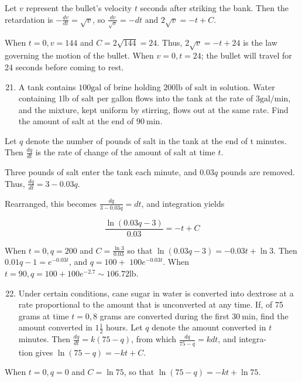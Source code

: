 \documentclass[10pt]{article}
\begin{document}
Let $v$ represent the bullet's velocity $t$ seconds after striking the bank. Then the retardation is $-\frac{d v}{d t}=\sqrt{v}$, so $\frac{d v}{\sqrt{v}}=-d t$ and $2 \sqrt{v}=-t+C$.

When $t=0, v=144$ and $C=2 \sqrt{144}=24$. Thus, $2 \sqrt{v}=-t+24$ is the law governing the motion of the bullet. When $v=0, t=24$; the bullet will travel for 24 seconds before coming to rest.

\begin{enumerate}
  \setcounter{enumi}{20}
  \item A tank contains $100 \mathrm{gal}$ of brine holding $200 \mathrm{lb}$ of salt in solution. Water containing $1 \mathrm{lb}$ of salt per gallon flows into the tank at the rate of $3 \mathrm{gal} / \mathrm{min}$, and the mixture, kept uniform by stirring, flows out at the same rate. Find the amount of salt at the end of $90 \mathrm{~min}$.
\end{enumerate}

Let $q$ denote the number of pounds of salt in the tank at the end of $\mathrm{t}$ minutes. Then $\frac{d q}{d t}$ is the rate of change of the amount of salt at time $t$.

Three pounds of salt enter the tank each minute, and $0.03 q$ pounds are removed. Thus, $\frac{d q}{d t}=3-0.03 q$.

Rearranged, this becomes $\frac{d q}{3-0.03 q}=d t$, and integration yields

$$
\frac{\ln (0.03 q-3)}{0.03}=-t+C
$$

When $t=0, q=200$ and $C=\frac{\ln 3}{0.03}$ so that $\ln (0.03 q-3)=-0.03 t+\ln 3$. Then $0.01 q-1=e^{-0.03 t}$, and $q=100+$ $100 e^{-0.03 t}$. When $t=90, q=100+100 e^{-2.7} \sim 106.72 \mathrm{lb}$.

\begin{enumerate}
  \setcounter{enumi}{21}
  \item Under certain conditions, cane sugar in water is converted into dextrose at a rate proportional to the amount that is unconverted at any time. If, of 75 grams at time $t=0,8$ grams are converted during the first $30 \mathrm{~min}$, find the amount converted in $1 \frac{1}{2}$ hours. Let $q$ denote the amount converted in $t$ minutes. Then $\frac{d q}{d t}=k(75-q)$, from which $\frac{d q}{75-q}=k d t$, and integra-\\
tion gives $\ln (75-q)=-k t+C$.
\end{enumerate}

When $t=0, q=0$ and $C=\ln 75$, so that $\ln (75-q)=-k t+\ln 75$.
\end{document}
